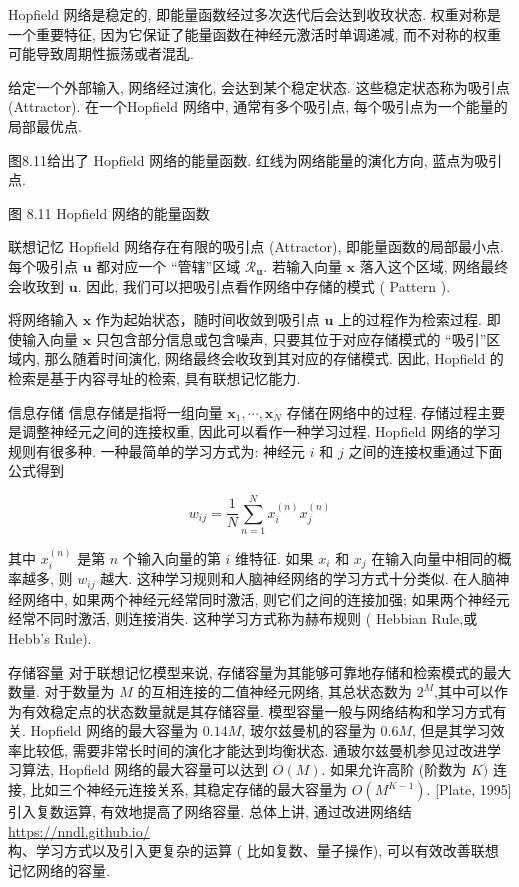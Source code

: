 \documentclass[10pt]{article}
\begin{document}
Hopfield 网络是稳定的, 即能量函数经过多次迭代后会达到收玫状态. 权重对称是一个重要特征, 因为它保证了能量函数在神经元激活时单调递减, 而不对称的权重可能导致周期性振荡或者混乱.

给定一个外部输入, 网络经过演化, 会达到某个稳定状态. 这些稳定状态称为吸引点 (Attractor). 在一个Hopfield 网络中, 通常有多个吸引点, 每个吸引点为一个能量的局部最优点.

图8.11给出了 Hopfield 网络的能量函数. 红线为网络能量的演化方向, 蓝点为吸引点.



图 8.11 Hopfield 网络的能量函数

联想记忆 Hopfield 网络存在有限的吸引点 (Attractor), 即能量函数的局部最小点. 每个吸引点 $\boldsymbol{u}$ 都对应一个 “管辖”区域 $\mathcal{R}_{\boldsymbol{u}}$. 若输入向量 $\boldsymbol{x}$ 落入这个区域, 网络最终会收玫到 $\boldsymbol{u}$. 因此, 我们可以把吸引点看作网络中存储的模式 ( Pattern ).

将网络输入 $\boldsymbol{x}$ 作为起始状态，随时间收敛到吸引点 $\boldsymbol{u}$ 上的过程作为检索过程. 即使输入向量 $\boldsymbol{x}$ 只包含部分信息或包含噪声, 只要其位于对应存储模式的 “吸引”区域内, 那么随着时间演化, 网络最终会收玫到其对应的存储模式. 因此, Hopfield 的检索是基于内容寻址的检索, 具有联想记忆能力.

信息存储 信息存储是指将一组向量 $\boldsymbol{x}_{1}, \cdots, \boldsymbol{x}_{N}$ 存储在网络中的过程. 存储过程主要是调整神经元之间的连接权重, 因此可以看作一种学习过程. Hopfield 网络的学习规则有很多种. 一种最简单的学习方式为: 神经元 $i$ 和 $j$ 之间的连接权重通过下面公式得到


\begin{equation*}
w_{i j}=\frac{1}{N} \sum_{n=1}^{N} x_{i}^{(n)} x_{j}^{(n)} \tag{8.37}
\end{equation*}


其中 $x_{i}^{(n)}$ 是第 $n$ 个输入向量的第 $i$ 维特征. 如果 $x_{i}$ 和 $x_{j}$ 在输入向量中相同的概率越多, 则 $w_{i j}$ 越大. 这种学习规则和人脑神经网络的学习方式十分类似. 在人脑神经网络中, 如果两个神经元经常同时激活, 则它们之间的连接加强; 如果两个神经元经常不同时激活, 则连接消失. 这种学习方式称为赫布规则 ( Hebbian Rule,或 Hebb’s Rule).

存储容量 对于联想记忆模型来说, 存储容量为其能够可靠地存储和检索模式的最大数量. 对于数量为 $M$ 的互相连接的二值神经元网络, 其总状态数为 $2^{M}$,其中可以作为有效稳定点的状态数量就是其存储容量. 模型容量一般与网络结构和学习方式有关. Hopfield 网络的最大容量为 $0.14 M$, 玻尔兹曼机的容量为 $0.6 M$, 但是其学习效率比较低, 需要非常长时间的演化才能达到均衡状态. 通玻尔兹曼机参见过改进学习算法, Hopfield 网络的最大容量可以达到 $O(M)$. 如果允许高阶 (阶数为 $K)$ 连接, 比如三个神经元连接关系, 其稳定存储的最大容量为 $O\left(M^{K-1}\right)$. [Plate, 1995] 引入复数运算, 有效地提高了网络容量. 总体上讲, 通过改进网络结 \href{https://nndl.github.io/}{https://nndl.github.io/}\\
构、学习方式以及引入更复杂的运算 ( 比如复数、量子操作), 可以有效改善联想记忆网络的容量.
\end{document}
